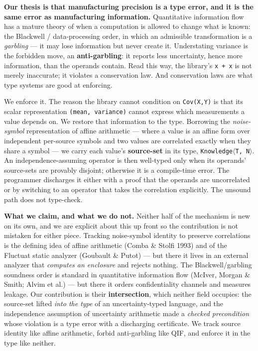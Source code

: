 \documentclass[sigplan,review,anonymous,10pt]{acmart}
\begin{document}
\textbf{Our thesis is that manufacturing precision is a type error, and it is the same error as manufacturing information.} Quantitative information flow has a mature theory of when a computation is allowed to change what is known: the Blackwell / data-processing order, in which an admissible transformation is a \emph{garbling} --- it may lose information but never create it. Understating variance is the forbidden move, an \textbf{anti-garbling}: it reports less uncertainty, hence more information, than the operands contain. Read this way, the library's \texttt{x + x} is not merely inaccurate; it violates a conservation law. And conservation laws are what type systems are good at enforcing.

We enforce it. The reason the library cannot condition on \texttt{Cov(X,Y)} is that its scalar representation \texttt{(mean, variance)} cannot express which measurements a value depends on. We restore that information to the type. Borrowing the \emph{noise-symbol} representation of affine arithmetic --- where a value is an affine form over independent per-source symbols and two values are correlated exactly when they share a symbol --- we carry each value's \textbf{source-set} in its type, \texttt{Knowledge$\langle$T, N$\rangle$}. An independence-assuming operator is then well-typed only when its operands' source-sets are provably disjoint; otherwise it is a compile-time error. The programmer discharges it either with a proof that the operands are uncorrelated or by switching to an operator that takes the correlation explicitly. The unsound path does not type-check.

\textbf{What we claim, and what we do not.} Neither half of the mechanism is new on its own, and we are explicit about this up front so the contribution is not mistaken for either piece. Tracking noise-symbol identity to preserve correlations is the defining idea of affine arithmetic (Comba \& Stolfi 1993) and of the Fluctuat static analyzer (Goubault \& Putot) --- but there it lives in an external analyzer that \emph{computes an enclosure} and rejects nothing. The Blackwell/garbling soundness order is standard in quantitative information flow (McIver, Morgan \& Smith; Alvim et al.) --- but there it orders confidentiality channels and measures leakage. Our contribution is their \textbf{intersection}, which neither field occupies: the source-set lifted \emph{into the type} of an uncertainty-typed language, and the independence assumption of uncertainty arithmetic made a \emph{checked precondition} whose violation is a type error with a discharging certificate. We track source identity like affine arithmetic, forbid anti-garbling like QIF, and enforce it in the type like neither.
\end{document}
